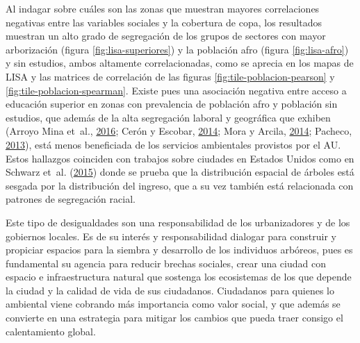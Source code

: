 \documentclass[12pt,a4paper,oneside, openany]{book}
\theoremstyle{definition}
\theoremstyle{definition}
\theoremstyle{definition}
\theoremstyle{remark}
\begin{document}
Al indagar sobre cuáles son las zonas que muestran mayores correlaciones
negativas entre las variables sociales y la cobertura de copa, los
resultados muestran un alto grado de segregación de los grupos de
sectores con mayor arborización (figura \ref{fig:lisa-superiores}) y la
población afro (figura \ref{fig:lisa-afro}) y sin estudios, ambos
altamente correlacionadas, como se aprecia en los mapas de LISA y las
matrices de correlación de las figuras \ref{fig:tile-poblacion-pearson}
y \ref{fig:tile-poblacion-spearman}. Existe pues una asociación negativa
entre acceso a educación superior en zonas con prevalencia de población
afro y población sin estudios, que además de la alta segregación laboral
y geográfica que exhiben (Arroyo Mina et~al.,
\protect\hyperlink{ref-arroyo_mina_afrocolombianos_2016}{2016}; Cerón y
Escobar, \protect\hyperlink{ref-ceron_indice_2014}{2014}; Mora y Arcila,
\protect\hyperlink{ref-mora_brechas_2014}{2014}; Pacheco,
\protect\hyperlink{ref-PACHECO2013121}{2013}), está menos beneficiada de
los servicios ambientales provistos por el AU. Estos hallazgos coinciden
con trabajos sobre ciudades en Estados Unidos como en Schwarz et~al.
(\protect\hyperlink{ref-schwarz_trees_2015}{2015}) donde se prueba que
la distribución espacial de árboles está sesgada por la distribución del
ingreso, que a su vez también está relacionada con patrones de
segregación racial.

Este tipo de desigualdades son una responsabilidad de los urbanizadores
y de los gobiernos locales. Es de su interés y responsabilidad dialogar
para construir y propiciar espacios para la siembra y desarrollo de los
individuos arbóreos, pues es fundamental su agencia para reducir brechas
sociales, crear una ciudad con espacio e infraestructura natural que
sostenga los ecosistemas de los que depende la ciudad y la calidad de
vida de sus ciudadanos. Ciudadanos para quienes lo ambiental viene
cobrando más importancia como valor social, y que además se convierte en
una estrategia para mitigar los cambios que pueda traer consigo el
calentamiento global.
\end{document}
